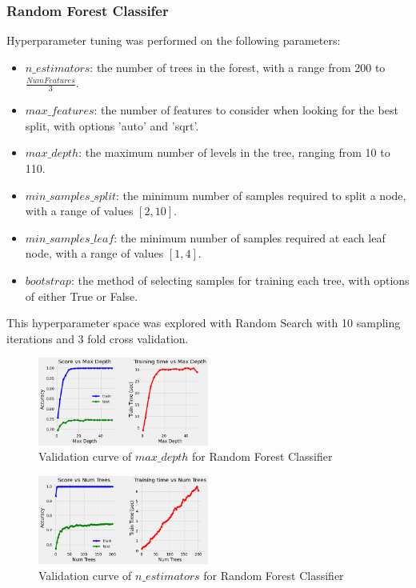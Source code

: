 \documentclass{article}
\begin{document}
\subsubsection{Random Forest Classifer}

Hyperparameter tuning was performed on the following parameters:
\begin{itemize}
\item $n\_estimators$: the number of trees in the forest, with a range from 200 to $\frac{Num Features}{3}$.
\item $max\_features$: the number of features to consider when looking for the best split, with options 'auto' and 'sqrt'.
\item $max\_depth$: the maximum number of levels in the tree, ranging from 10 to 110.
\item $min\_samples\_split$: the minimum number of samples required to split a node, with a range of values $[2, 10]$.
\item $min\_samples\_leaf$: the minimum number of samples required at each leaf node, with a range of values $[1, 4]$.
\item $bootstrap$: the method of selecting samples for training each tree, with options of either True or False.
\end{itemize}

This hyperparameter space was explored with Random Search with 10 sampling iterations and 3 fold cross validation.

\begin{figure}[h]
  \centering
  \includegraphics[width=0.5\textwidth]{rf_max_depth.png}
  \caption{Validation curve of $max\_depth$ for Random Forest Classifier}
  \end{figure}

\begin{figure}[h]
  \centering
  \includegraphics[width=0.5\textwidth]{rf_num_trees.png}
  \caption{Validation curve of $n\_estimators$ for Random Forest Classifier}
  \end{figure}
\end{document}
